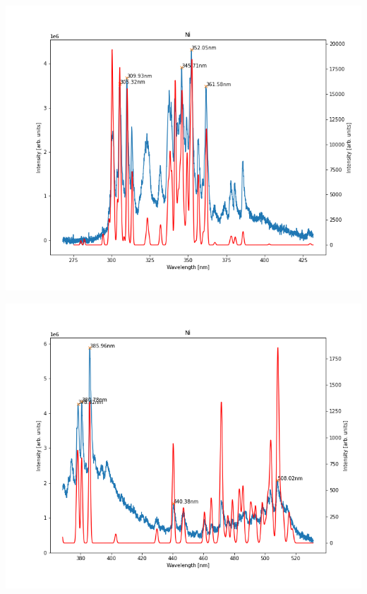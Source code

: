 \documentclass{beamer}
\begin{document}
\begin{frame}
    \includegraphics[scale=0.45]{Ni/350nm.png}
\end{frame}

\begin{frame}
    \includegraphics[scale=0.45]{Ni/450nm.png}
\end{frame}
\end{document}
